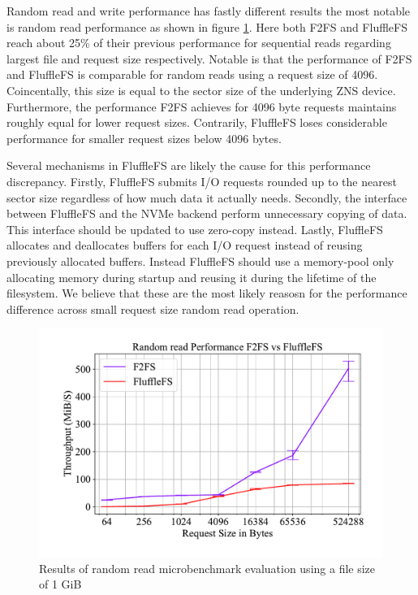 Random read and write performance has fastly different results the most notable
is random read performance as shown in figure \ref{figure:readrandom}. Here both
F2FS and FluffleFS reach about 25\% of their previous performance for sequential
reads regarding largest file and request size respectively. Notable is that
the performance of F2FS and FluffleFS is comparable for random reads using a
request size of 4096. Coincentally, this size is equal to the sector size of
the underlying ZNS device. Furthermore, the performance F2FS achieves for 4096
byte requests maintains roughly equal for lower request sizes. Contrarily,
FluffleFS loses considerable performance for smaller request sizes below
4096 bytes.

Several mechanisms in FluffleFS are likely the cause for this performance
discrepancy. Firstly, FluffleFS submits I/O requests rounded up to the nearest
sector size regardless of how much data it actually needs. Secondly, the
interface between FluffleFS and the NVMe backend perform unnecessary copying of
data. This interface should be updated to use zero-copy instead. Lastly,
FluffleFS allocates and deallocates buffers for each I/O request instead of
reusing previously allocated buffers. Instead FluffleFS should use a memory-pool
only allocating memory during startup and reusing it during the lifetime of the
filesystem. We believe that these are the most likely reasosn for the
performance difference across small request size random read operation.

\begin{figure}[h]
    \centering
	\includegraphics[width=1\textwidth]{resources/images/results-random-read.pdf}
	\caption{Results of random read microbenchmark evaluation using a file size
        of 1 GiB}
    \label{figure:readrandom}
\end{figure}

